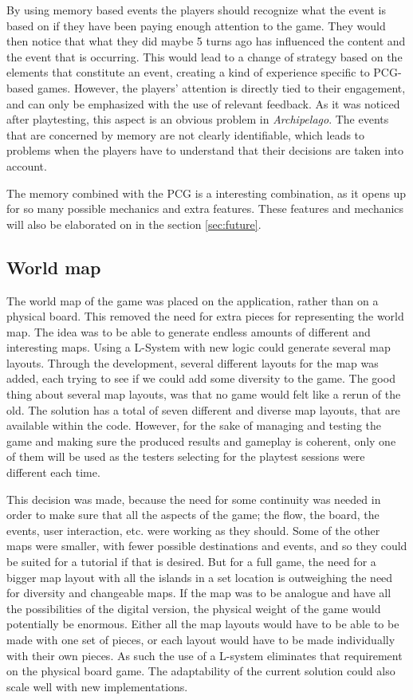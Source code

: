 By using memory based events the players should recognize what the event is based on if they have been paying enough attention to the game. They would then notice that what they did maybe 5 turns ago has influenced the content and the event that is occurring. This would lead to a change of strategy based on the elements that constitute an event, creating a kind of experience specific to PCG-based games. However, the players' attention is directly tied to their engagement, and can only be emphasized with the use of relevant feedback. As it was noticed after playtesting, this aspect is an obvious problem in \textit{Archipelago}. The events that are concerned by memory are not clearly identifiable, which leads to problems when the players have to understand that their decisions are taken into account. 

The memory combined with the PCG is a interesting combination, as it opens up for so many possible mechanics and extra features. These features and mechanics will also be elaborated on in the section \ref{sec:future}.

\subsection{World map}
The world map of the game was placed on the application, rather than on a physical board. This removed the need for extra pieces for representing the world map. The idea was to be able to generate endless amounts of different and interesting maps. Using a L-System with new logic could generate several map layouts. Through the development, several different layouts for the map was added, each trying to see if we could add some diversity to the game. The good thing about several map layouts, was that no game would felt like a rerun of the old. The solution has a total of seven different and diverse map layouts, that are available within the code. However, for the sake of managing and testing the game and making sure the produced results and gameplay is coherent, only one of them will be used as the testers selecting for the playtest sessions were different each time. 

This decision was made, because the need for some continuity was needed in order to make sure that all the aspects of the game; the flow, the board, the events, user interaction, etc. were working as they should. Some of the other maps were smaller, with fewer possible destinations and events, and so they could be suited for a tutorial if that is desired. But for a full game, the need for a bigger map layout with all the islands in a set location is outweighing the need for diversity and changeable maps. If the map was to be analogue and have all the possibilities of the digital version, the physical weight of the game would potentially be enormous. Either all the map layouts would have to be able to be made with one set of pieces, or each layout would have to be made individually with their own pieces. As such the use of a L-system eliminates that requirement on the physical board game. The adaptability of the current solution could also scale well with new implementations.

